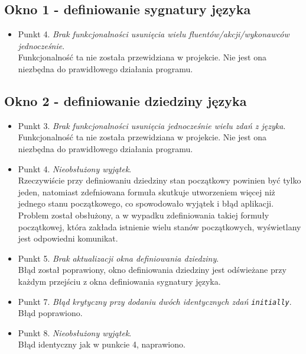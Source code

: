 \documentclass{article}
\begin{document}
\subsection{Okno 1 - definiowanie sygnatury języka}
\begin{itemize}
        \item Punkt 4. \textit{Brak funkcjonalności usunięcia wielu  fluentów/akcji/wykonawców jednocześnie}.\\
        Funkcjonalność ta nie została przewidziana w projekcie. Nie jest ona niezbędna do prawidłowego działania programu.
    \end{itemize}
    
\subsection{Okno 2 - definiowanie dziedziny języka}
\begin{itemize}
        \item Punkt 3. \textit{Brak funkcjonalności usunięcia jednocześnie wielu zdań z języka}.\\
        Funkcjonalność ta nie została przewidziana w projekcie. Nie jest ona niezbędna do prawidłowego działania programu.
        \item Punkt 4. \textit{Nieobsłużony wyjątek}.\\
        Rzeczywiście przy definiowaniu dziedziny stan początkowy powinien być tylko jeden, natomiast zdefniowana formuła skutkuje utworzeniem więcej niż jednego stanu początkowego, co spowodowało wyjątek i błąd aplikacji. Problem został obsłużony, a w wypadku zdefiniowania takiej formuły początkowej, która zakłada istnienie wielu stanów początkowych, wyświetlany jest odpowiedni komunikat.
        \item Punkt 5. \textit{Brak aktualizacji okna definiowania dziedziny}.\\
        Błąd został poprawiony, okno definiowania dziedziny jest odświeżane przy każdym przejściu z okna definiowania sygnatury języka.
        \item Punkt 7. \textit{Błąd krytyczny przy dodaniu dwóch identycznych zdań \texttt{initially}}.\\
        Błąd poprawiono.
        \item Punkt 8. \textit{Nieobsłużony wyjątek}.\\
        Błąd identyczny jak w punkcie 4, naprawiono.
    \end{itemize}
\end{document}
